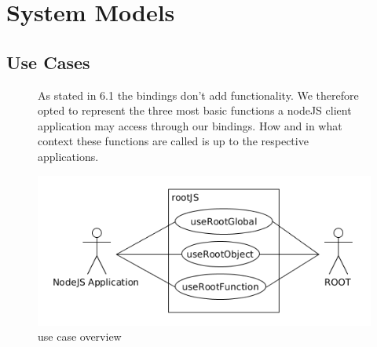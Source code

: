 \chapter{System Models}

\pagebreak[4]

\section{Use Cases}
\begin{figure}[htb]
As stated in 6.1 the bindings don't add functionality. We 
therefore opted to represent the three most basic functions a nodeJS 
client application may access through our bindings. How and in what 
context these functions are called is up to the respective applications. 

\includegraphics[width=16cm]{./latex/resources/usecaseOverview.png}
	\caption{use case overview}
\end{figure}

\pagebreak[4]



\pagebreak[4]

